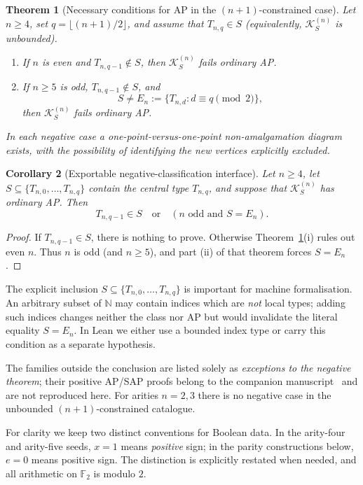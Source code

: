 \documentclass[11pt,a4paper]{article}
\newtheorem{theorem}{Theorem}[section]
\newtheorem{corollary}[theorem]{Corollary}
\theoremstyle{remark}
\newcommand{\K}{\mathcal K}
\begin{document}
\begin{theorem}[Necessary conditions for AP in the $(n+1)$-constrained case]
\label{thm:classification}
Let $n\ge4$, set $q=\lfloor(n+1)/2\rfloor$, and assume that
$T_{n,q}\in S$ (equivalently, $\K^{(n)}_S$ is unbounded).
\begin{enumerate}[label=\textup{(\roman*)},leftmargin=15mm]
\item If $n$ is even and $T_{n,q-1}\notin S$, then
$\K^{(n)}_S$ fails ordinary AP.
\item If $n\ge5$ is odd, $T_{n,q-1}\notin S$, and
\[
 S\ne E_n:=\{T_{n,d}: d\equiv q\pmod2\},
\]
then $\K^{(n)}_S$ fails ordinary AP.
\end{enumerate}
In each negative case a one-point-versus-one-point
non-amalgamation diagram exists, with the possibility of identifying
the new vertices explicitly excluded.
\end{theorem}

\begin{corollary}[Exportable negative-classification interface]
\label{cor:export}
Let $n\ge4$, let $S\subseteq\{T_{n,0},\ldots,T_{n,q}\}$
contain the central type $T_{n,q}$, and suppose that
$\K_S^{(n)}$ has ordinary AP. Then
\[
 \boxed{T_{n,q-1}\in S\quad\text{or}\quad
      (n\text{ odd and }S=E_n).}
\]
\end{corollary}
\begin{proof}
If $T_{n,q-1}\in S$, there is nothing to prove. Otherwise
Theorem~\ref{thm:classification}(i) rules out even $n$. Thus $n$
is odd (and $n\ge5$), and part (ii) of that theorem forces
$S=E_n$.
\end{proof}

The explicit inclusion $S\subseteq\{T_{n,0},\ldots,T_{n,q}\}$
is important for machine formalisation. An arbitrary subset of
$\mathbb N$ may contain indices which are \emph{not} local types;
adding such indices changes neither the class nor AP but would
invalidate the literal equality $S=E_n$. In Lean we either use a
bounded index type or carry this condition as a separate hypothesis.

The families outside the conclusion are listed solely as \emph{exceptions
to the negative theorem}; their positive AP/SAP proofs belong to the
companion manuscript~\cite{catalogue} and are not reproduced here.
For arities $n=2,3$ there is no negative case in the unbounded
$(n+1)$-constrained catalogue.

For clarity we keep two distinct conventions for Boolean data. In the
arity-four and arity-five seeds, $x=1$ means \emph{positive} sign;
in the parity constructions below, $e=0$ means positive sign.
The distinction is explicitly restated when needed, and all arithmetic
on $\mathbb F_2$ is modulo $2$.
\end{document}
